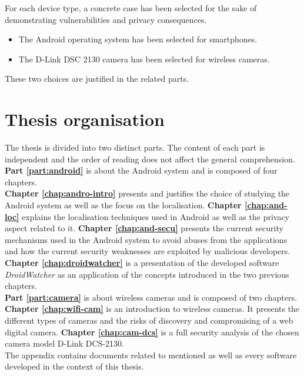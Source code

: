 For each device type, a concrete case has been selected for the sake of demonstrating
vulnerabilities and privacy consequences.
\begin{itemize}
\item The Android operating system has been selected for smartphones.
\item The D-Link DSC 2130 camera has been selected for wireless cameras.
\end{itemize}
These two choices are justified in the related parts.


\section{Thesis organisation}

The thesis is divided into two distinct parts.
The content of each part is independent and the order of reading does not affect the general comprehension.\\

\textbf{Part \ref{part:android}} is about the Android system and is composed of four chapters.\\

\textbf{Chapter \ref{chap:andro-intro}} presents and justifies the choice of studying the Android system as well as the focus on the localisation.
\textbf{Chapter \ref{chap:and-loc}} explains the localisation techniques used in Android as well as the privacy aspect related to it.
\textbf{Chapter \ref{chap:and-secu}} presents the current security mechanisms used in the Android system to avoid abuses from the applications and how the current security weaknesses are exploited by malicious developers.
\textbf{Chapter \ref{chap:droidwatcher}} is a presentation of the developed software \emph{DroidWatcher} as an application of the concepts introduced in the two previous chapters.\\

\textbf{Part \ref{part:camera}} is about wireless cameras and is composed of two chapters.\\

\textbf{Chapter \ref{chap:wifi-cam}} is an introduction to wireless cameras.
It presents the different types of cameras and the risks of discovery and compromising of a web digital camera.
\textbf{Chapter \ref{chap:cam-dcs}} is a full security analysis of the chosen camera model D-Link DCS-2130.\\

The appendix contains documents related to mentioned as well as every software developed in the context of this thesis.

